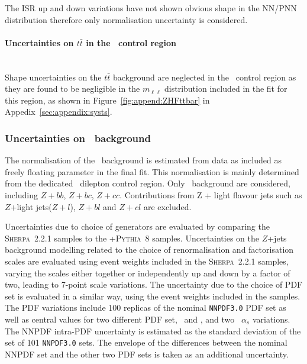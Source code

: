 The ISR up and down variations have not shown obvious shape 
in the NN/PNN distribution therefore only normalisation uncertainty is considered. 


\paragraph{Uncertainties on $t\bar{t}$ in the \ZHF\ control region}\mbox{}\\

Shape uncertainties on the $t\bar{t}$ background are neglected in the \ZHF\ 
control region as they are found to be negligible 
in the $m_{\ell\ell}$ distribution included in the 
fit for this region, as shown in Figure~\ref{fig:append:ZHFttbar} in 
Appedix~\ref{sec:appendix:systs}.





\subsubsection{Uncertainties on \ZHF\ background}
\label{sec:DiHiggs:ZHFsysts}
The normalisation of the \ZHF\ background is estimated 
from data as included as freely floating parameter in 
the final fit. This normalisation is mainly determined 
from the dedicated \ZHF\ dilepton control region.
Only \ZHF\ background are considered, 
including $Z+bb$, $Z+bc$, $Z+cc$. 
Contributions from Z + light flavour jets 
such as $Z$+light jets($Z+l$), $Z+bl$ and $Z+cl$ are excluded. 

Uncertainties due to choice of generators are evaluated
by comparing the \textsc{Sherpa}~2.2.1 samples to the
\MADGRAPH+\textsc{Pythia}~8 samples. 
Uncertainties on the $Z$+jets background modelling 
related to the choice of renormalisation and factorisation 
scales are evaluated using event weights included 
in the \textsc{Sherpa}~2.2.1 samples, varying the scales either together 
or independently up and down by a factor of two, 
leading to 7-point scale variations. 
The uncertainty due to the choice of PDF set is evaluated 
in a similar way, using the event weights included in the samples. 
The PDF variations include 100 replicas of the nominal \texttt{NNPDF3.0} PDF set 
as well as central values for two different PDF set, 
\mmhtnnlo\ and \ctfourteennlo, and two \nnpdfnnlo\ $\alpha_s$ variations.  
The NNPDF intra-PDF uncertainty is estimated as the standard deviation 
of the set of 101 \texttt{NNPDF3.0} sets. 
The envelope of the differences between the nominal NNPDF set 
and the other two PDF sets is taken as an additional uncertainty. 

